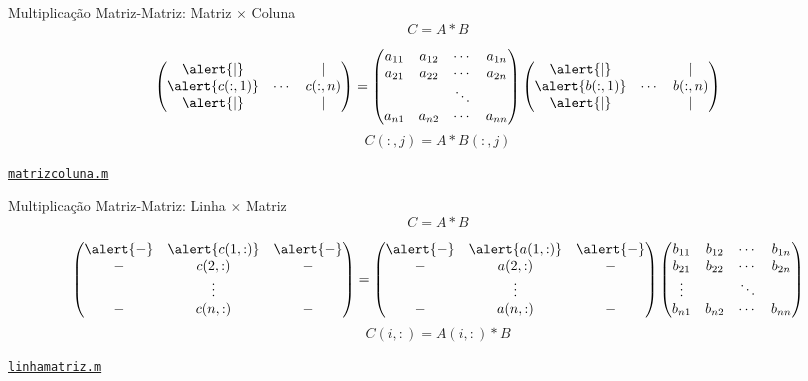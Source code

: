 \documentclass[hyperref={pdfpagelabels=false}]{beamer}
\begin{document}
\begin{frame}{Multiplicação Matriz-Matriz: Matriz $\times$ Coluna}
  $$C = A*B$$

  \footnotesize{%
    \begin{equation*}
      \begin{pmatrix}
        \alert{|} & & | \\
        \alert{c(:,1)} & \cdots & c(:,n) \\
        \alert{|} & & |
      \end{pmatrix}
      =
      \begin{pmatrix} 
        a_{11} & a_{12} & \cdots & a_{1n}\\ 
        a_{21} & a_{22} & \cdots & a_{2n}\\
        & & \ddots & \\ 
        a_{n1} & a_{n2} & \cdots & a_{nn} 
      \end{pmatrix}
      \begin{pmatrix}
        \alert{|} & & |\\ 
        \alert{b(:,1)} & \cdots & b(:,n)\\
        \alert{|} & & |
      \end{pmatrix}
    \end{equation*}
  }
  \vfill
  $$C(:,j) = A*B(:,j)$$
  \begin{center} \href{listings/matrizcoluna.m}{\underline{\texttt{matrizcoluna.m}}} \end{center}
\end{frame}

\begin{frame}{Multiplicação Matriz-Matriz: Linha $\times$ Matriz}
  $$C = A*B$$
  
  \begin{equation*}
    \begin{pmatrix}
      \alert{\relbar} & \alert{c(1,:)} & \alert{\relbar}\\
      \relbar & c(2,:) & \relbar\\
      &  \vdots      & \\
      \relbar & c(n,:) & \relbar
    \end{pmatrix}
    =
    \begin{pmatrix} 
      \alert{\relbar} & \alert{a(1,:)} & \alert{\relbar}\\ 
      \relbar & a(2,:) & \relbar\\
      & \vdots & \\ 
      \relbar & a(n,:) & \relbar 
    \end{pmatrix}
    \begin{pmatrix}
      b_{11} & b_{12} & \cdots & b_{1n}\\ 
      b_{21} & b_{22} & \cdots & b_{2n}\\
      \vdots & & \ddots & \\ 
      b_{n1} & b_{n2} & \cdots & b_{nn} 
    \end{pmatrix}
  \end{equation*}
  \vfill
  $$C(i,:) = A(i,:)*B$$
  \begin{center} \href{listings/linhamatriz.m}{\underline{\texttt{linhamatriz.m}}} \end{center}
\end{frame}
\end{document}

